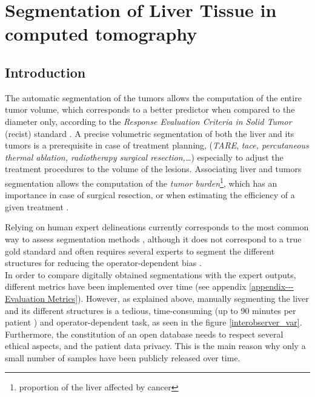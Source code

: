 

\chapter{Segmentation of Liver Tissue in computed tomography} \label{SegSemantic}

\section{Introduction}


The automatic segmentation of the tumors allows the computation 
of the entire tumor volume, which corresponds to a better predictor when
compared to the diameter only, according to the \emph{Response
	Evaluation Criteria in Solid Tumor} (\ac{recist}) standard \cite{Eisenhauer2008, Ye2017}. A precise
volumetric segmentation of both the liver and its tumors is a
prerequisite in case of treatment planning, (\emph{TARE}, \emph{\ac{tace},
	percutaneous thermal ablation, radiotherapy surgical resection,\ldots{}}) especially to adjust the treatment procedures to the volume of the lesions\cite{Al-Nahhas2014, Yamada1983, Albain2009, Rossi96}. Associating liver and tumors
segmentation allows the computation of the \emph{tumor burden}\footnote{proportion of the liver affected by cancer}, which
has an importance in case of surgical resection, or when estimating the
efficiency of a given treatment \cite{Nordlinger1996, Jagannath1986, Gobbi2004, Bauknecht2010, Bornemann2007, Heussel2007, Kuhnigk2006, Puesken2010}.

Relying on human expert
delineations currently corresponds to the most common way to assess
segmentation methods \cite{Bilic2019}, although it does not correspond 
to a true gold standard \cite{Heimann2009} and often requires several experts to segment the
different structures for reducing the operator-dependent bias \cite{Echegaray2015, Moltz2009}.\\
In order to compare digitally obtained segmentations with the expert
outputs, different metrics have been implemented over time (see appendix \ref{appendix---Evaluation Metrics}). However, as
explained above, manually segmenting the liver and its different
structures is a tedious, time-consuming (up to 90 minutes per patient
\cite{Gotra2017}) and operator-dependent task, as seen in the figure \ref{interobserver_var}.
Furthermore, the constitution of an open database needs to respect
several ethical aspects, and the patient data privacy. This is the main
reason why only a small number of samples have been publicly released
over time.

